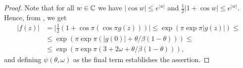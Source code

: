\begin{proof}
    Note that for all $w \in \mathbb{C}$ we have $\vert \cos w \vert \leq e^{\vert w \vert}$ and $\frac{1}{2} \vert 1 + \cos w \vert \leq e^{\vert w \vert}$. Hence, from , we get
    \begin{align*}
        \vert f(z) \vert &= \vert {\textstyle \frac{1}{2}} ( 1 + \cos \pi ( \cos \pi g(z) ) ) \vert \leq \exp ( \pi \exp \pi \vert g(z) \vert ) \leq \\ &\leq \exp (\pi \exp \pi (\vert g(0) \vert + \theta / \beta(1 - \theta))) \leq \\
        &\leq \exp ( \pi \exp \pi ( 3 + 2 \omega + \theta / \beta(1 - \theta) ) ),
    \end{align*}
    and defining $\psi(\theta, \omega)$ as the final term establishes the assertion.
\end{proof}